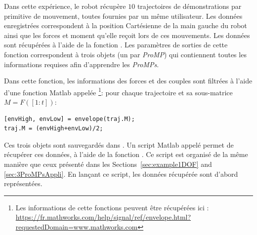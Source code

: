 \documentclass[utf8]{frontiersSCNS} %
\newcommand{\rev}[1]{\textcolor{blue}{#1}}
\begin{document}
Dans cette expérience, le robot récupère $10$ trajectoires de démonstrations par primitive de mouvement, toutes fournies par un même utilisateur. Les données enregistrées correspondent à la position Cartésienne de la main gauche du robot ainsi que les forces et moment qu'elle reçoit lors de ces mouvements. Les données sont récupérées à l'aide de la fonction . Les paramètres de sorties de cette fonction correspondent à trois objets  (un par \textit{ProMP}) qui contiennent toutes les informations requises afin d'apprendre les \textit{ProMPs}. 

Dans cette fonction, les informations des forces et des couples sont filtrées à l'aide d'une fonction Matlab appelée \footnote{Les informations de cette fonctions peuvent être récupérées ici : \url{https://fr.mathworks.com/help/signal/ref/envelope.html?requestedDomain=www.mathworks.com}}: pour chaque trajectoire  et sa sous-matrice $M = F([1:t])$:
\begin{lstlisting}
[envHigh, envLow] = envelope(traj.M);
traj.M = (envHigh+envLow)/2;
\end{lstlisting}
Ces trois objets sont sauvegardés dans . Un script Matlab appelé  permet de récupérer ces données, à l'aide de la fonction . Ce script est organisé de la même manière que ceux présenté dans les Sections~\ref{sec:example1DOF} and \ref{sec:3ProMPsAppli}. 
En lançant ce script, les données récupérée sont d'abord représentées.
\end{document}
